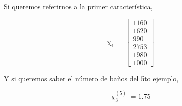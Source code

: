 \documentclass[twoside,twocolumn]{article}
\begin{document}
          Si queremos referirnos a la primer característica,

          \[
            \upchi_1
            =
            \begin{bmatrix}
              1160 \\
              1620 \\
              990 \\
              2753 \\
              1980 \\
              1000
            \end{bmatrix}
          \]

          Y si queremos saber el número de baños del 5to ejemplo, 

          \[
            \upchi^{(5)}_3
            =
            1.75
          \]
  
  
  
  
\end{document}
